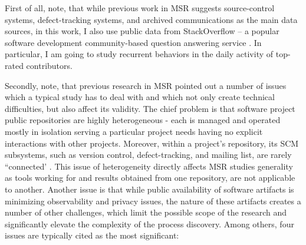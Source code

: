 First of all, note, that while previous work in MSR \cite{citeulike:4534888} suggests source-control systems, 
defect-tracking systems, and archived communications as the main data sources, in this work, I also use public data from 
StackOverflow -- a popular software development community-based question answering service \cite{MSRChallenge2013}.
In particular, I am going to study recurrent behaviors in the daily activity of top-rated contributors.

Secondly, note, that previous research in MSR pointed out a number of issues which a typical study has to deal with and which
not only create technical difficulties, but also affect its validity. 
The chief problem is that software project public repositories are highly heterogeneous - each is managed and operated 
mostly in isolation serving a particular project needs having no explicit interactions with other projects. 
Moreover, within a project's repository, its SCM subsystems, such as version control, defect-tracking, and mailing list, 
are rarely ``connected'  \cite{citeulike:13058334}. 
This issue of heterogeneity directly affects MSR studies generality as tools working for and results obtained from one repository,
are not applicable to another.
Another issue is that while public availability of software artifacts is minimizing observability and privacy issues, 
the nature of these artifacts creates a number of other challenges, which limit the possible scope of the research and 
significantly elevate the complexity of the process discovery. Among others, four issues are typically cited as the most significant:
